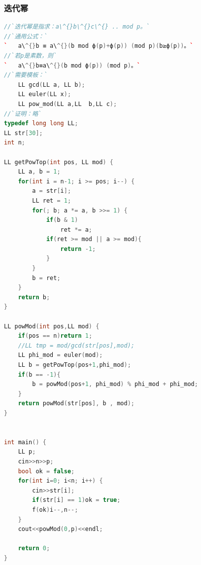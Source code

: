 \documentclass[a4paper]{article}
\begin{document}
\begin{CJK*}{UTF8}{gbsn}
\begin{multicols}{3}
\begin{flushleft}
\subsubsection{迭代幂}
\begin{lstlisting}[language={c++}]
//`迭代幂是指求：a\^{}b\^{}c\^{} .. mod p。`
//`通用公式：`
`	a\^{}b ≡ a\^{}(b mod ϕ(p)+ϕ(p)) (mod p)(b≥ϕ(p))。`
//`若p是素数，则`
`	a\^{}b≡a\^{}(b mod ϕ(p)) (mod p)。`
//`需要模板：`
	LL gcd(LL a, LL b);
	LL euler(LL x);
	LL pow_mod(LL a,LL  b,LL c);
//`证明：略`
typedef long long LL;
LL str[30];
int n;

LL getPowTop(int pos, LL mod) {
	LL a, b = 1;
	for(int i = n-1; i >= pos; i--) {
		a = str[i];
		LL ret = 1;
		for(; b; a *= a, b >>= 1) {
			if(b & 1)
				ret *= a;
			if(ret >= mod || a >= mod){
				return -1;
			}
		}
		b = ret;
	}
	return b;
}

LL powMod(int pos,LL mod) {
    if(pos == n)return 1;
    //LL tmp = mod/gcd(str[pos],mod);
    LL phi_mod = euler(mod);
    LL b = getPowTop(pos+1,phi_mod);
    if(b == -1){
        b = powMod(pos+1, phi_mod) % phi_mod + phi_mod;
    }
    return powMod(str[pos], b , mod);
}


int main() {
    LL p;
    cin>>n>>p;
    bool ok = false;
    for(int i=0; i<n; i++) {
        cin>>str[i];
		if(str[i] == 1)ok = true;
		f(ok)i--,n--;
    }
    cout<<powMod(0,p)<<endl;

    return 0;
}
\end{lstlisting}


\end{flushleft}
\end{multicols}
\end{CJK*}
\end{document}
